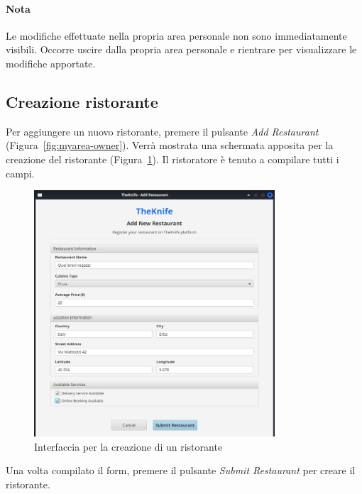 \paragraph{Nota}
Le modifiche effettuate nella propria area 
personale non sono immediatamente visibili. Occorre uscire 
dalla propria area personale e rientrare per visualizzare 
le modifiche apportate.
\subsection{Creazione ristorante}
Per aggiungere un nuovo ristorante, premere il pulsante \emph{Add Restaurant} (Figura~\ref{fig:myarea-owner}).
Verrà mostrata una schermata apposita per la creazione del ristorante (Figura~\ref{fig:add-restaurant}).
Il ristoratore è tenuto a compilare tutti i campi.
\begin{figure}[H]
    \centering
    \includegraphics[width=0.8\textwidth]{images/add-restaurant.png}
    \caption{Interfaccia per la creazione di un ristorante}
    \label{fig:add-restaurant}
\end{figure}
Una volta compilato il form, premere il pulsante \emph{Submit Restaurant} per creare il ristorante.

